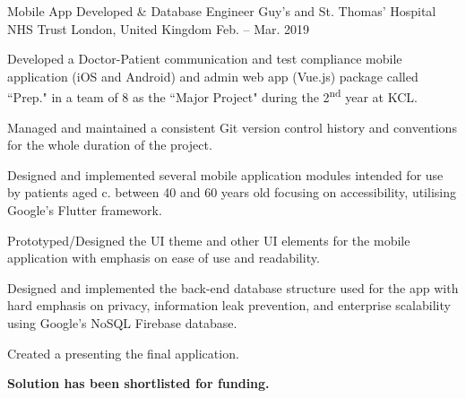 

\begin{cventries}

  \cventry
    {Mobile App Developed \& Database Engineer} %
    {Guy's and St. Thomas’ Hospital NHS Trust} %
    {London, United Kingdom} %
    {Feb. -- Mar. 2019} %
    {
      \begin{cvitems} %
        \item {Developed a Doctor-Patient communication and test compliance mobile application (iOS and Android) and admin web app (Vue.js) package called ``Prep." in a team of 8 as the ``Major Project" during the 2\textsuperscript{nd} year at KCL.}
        \item {Managed and maintained a consistent Git version control history and conventions for the whole duration of the project.}
        \item {Designed and implemented several mobile application modules intended for use by patients aged c. between 40 and 60 years old focusing on accessibility, utilising Google’s Flutter framework.}
        \item {Prototyped/Designed the UI theme and other UI elements for the mobile application with emphasis on ease of use and readability.}
        \item {Designed and implemented the back-end database structure used for the app with hard emphasis on privacy, information leak prevention, and enterprise scalability using Google’s NoSQL Firebase database.}
        \item {Created a \href{https://drive.google.com/file/d/1Pu6NSpqPXnWcaanUpIu_gd5C1bQnOyQi/preview}{} presenting the final application.}
        \item {\textbf{Solution has been shortlisted for funding.}}
      \end{cvitems}
    }

\end{cventries}
